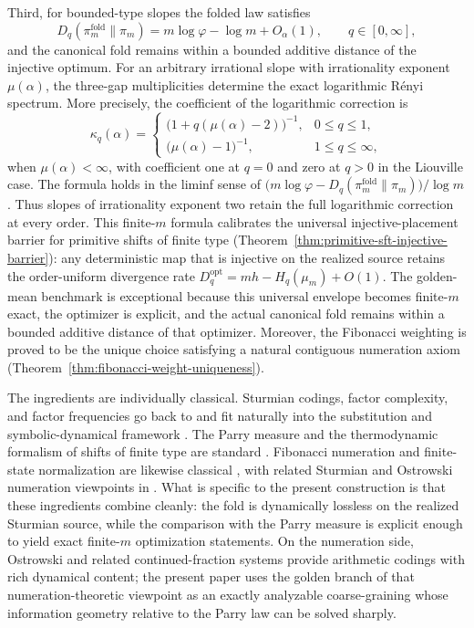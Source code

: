 Third, for bounded-type slopes the folded law satisfies
\[
D_q(\pi_m^{\mathrm{fold}}\|\pi_m)
=m\log\varphi-\log m+O_\alpha(1),
\qquad q\in[0,\infty],
\]
and the canonical fold remains within a bounded additive distance of the
injective optimum. For an arbitrary irrational slope with irrationality
exponent $\mu(\alpha)$, the three-gap multiplicities determine the exact
logarithmic R\'enyi spectrum. More precisely, the coefficient of the
logarithmic correction is
\[
\kappa_q(\alpha)=
\begin{cases}
\bigl(1+q(\mu(\alpha)-2)\bigr)^{-1},&0\le q\le1,\\
\bigl(\mu(\alpha)-1\bigr)^{-1},&1\le q\le\infty,
\end{cases}
\]
when \(\mu(\alpha)<\infty\), with coefficient one at \(q=0\) and zero at
\(q>0\) in the Liouville case. The formula holds
in the liminf sense of
$\bigl(m\log\varphi-D_q(\pi_m^{\mathrm{fold}}\|\pi_m)\bigr)/\log m$.
Thus slopes of irrationality exponent two retain the full logarithmic
correction at every order. This finite-$m$ formula calibrates the universal
injective-placement barrier for primitive shifts of finite type
(Theorem~\ref{thm:primitive-sft-injective-barrier}): any deterministic map
that is injective on the realized source retains the order-uniform
divergence rate $D_q^{\mathrm{opt}}=mh-H_q(\mu_m)+O(1)$. The golden-mean
benchmark is exceptional because this universal envelope becomes finite-$m$
exact, the optimizer is explicit, and the actual canonical fold remains
within a bounded additive distance of that optimizer. Moreover, the
Fibonacci weighting is proved to be the unique choice satisfying a natural
contiguous numeration axiom (Theorem~\ref{thm:fibonacci-weight-uniqueness}).

The ingredients are individually classical. Sturmian codings, factor
complexity, and factor frequencies go back to
\cite{MorseHedlund1940,Slater1950DistributionIntegers,Slater1967GapsSteps}
and fit naturally into the substitution and symbolic-dynamical framework
\cite{LindMarcus1995,QueffelecSubstitution,Fogg2002}. The Parry measure and
the thermodynamic formalism of shifts of finite type are standard
\cite{LindMarcus1995,WaltersErgodicTheory,ParryPollicott1990Zeta}. Fibonacci
numeration and finite-state normalization are likewise classical
\cite{Zeckendorf1972,Frougny1991FibonacciFiniteAutomata,Frougny1992NumbersAutomata},
with related Sturmian and Ostrowski numeration viewpoints in
\cite{Berthe2001Ostrowski,BaranwalaSchaefferShallit2021OstrowskiAutomatic}.
What is specific to the present construction is that these ingredients
combine cleanly: the fold is dynamically lossless on the realized Sturmian
source, while the comparison with the Parry measure is explicit enough to
yield exact finite-$m$ optimization statements. On the numeration side,
Ostrowski and related continued-fraction systems
\cite{Berthe2001Ostrowski,BaranwalaSchaefferShallit2021OstrowskiAutomatic}
provide arithmetic codings with rich dynamical content; the present paper
uses the golden branch of that numeration-theoretic viewpoint as an exactly
analyzable coarse-graining whose information geometry relative to the Parry
law can be solved sharply.

